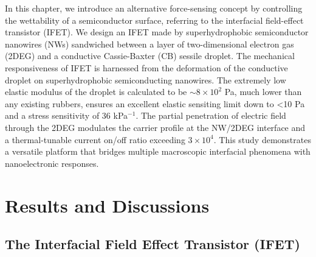  In this chapter, we introduce an alternative force-sensing concept by
 controlling the wettability of a semiconductor surface, referring to
 the interfacial field-effect transistor (IFET).  We design an IFET
 made by superhydrophobic semiconductor nanowires (NWs) sandwiched
 between a layer of two-dimensional electron gas (2DEG) and a
 conductive Cassie-Baxter (CB) sessile droplet.  The mechanical
 responsiveness of IFET is harnessed from the deformation of the
 conductive droplet on superhydrophobic semiconducting nanowires. The
 extremely low elastic modulus of the droplet is calculated to be
 $\sim{}8\times{}10^{2}$ Pa, much lower than any existing rubbers,
 ensures an excellent elastic sensiting limit down to \textless{}10 Pa
 and a stress sensitivity of 36 kPa$^{-1}$.
 The partial penetration
 of electric field through the 2DEG modulates the carrier profile at
 the NW/2DEG interface and a thermal-tunable current on/off ratio
 exceeding $3\times{}10^{4}$.
  This study demonstrates a
  versatile platform that bridges multiple macroscopic interfacial
  phenomena with nanoelectronic responses.


\section{Results and Discussions}
\label{sec:small-results-discussions}


\subsection{The Interfacial Field Effect Transistor (IFET)}
\label{sec:small-interf-field-effect}

